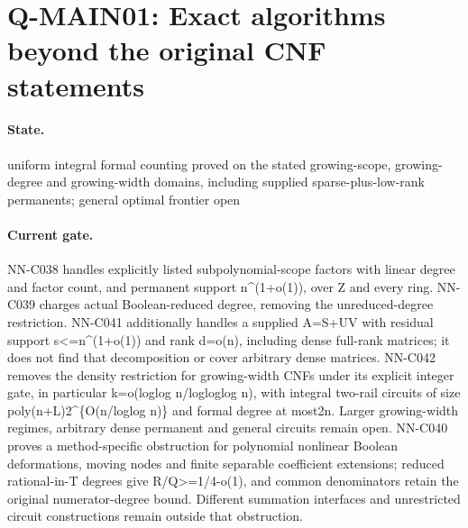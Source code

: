 \section{Q-MAIN01: Exact algorithms beyond the original CNF statements}
\paragraph{State.} uniform integral formal counting proved on the stated growing-scope, growing-degree and growing-width domains, including supplied sparse-plus-low-rank permanents; general optimal frontier open
\paragraph{Current gate.} NN-C038 handles explicitly listed subpolynomial-scope factors with linear degree and factor count, and permanent support n\textasciicircum{}(1+o(1)), over Z and every ring. NN-C039 charges actual Boolean-reduced degree, removing the unreduced-degree restriction. NN-C041 additionally handles a supplied A=S+UV with residual support s<=n\textasciicircum{}(1+o(1)) and rank d=o(n), including dense full-rank matrices; it does not find that decomposition or cover arbitrary dense matrices. NN-C042 removes the density restriction for growing-width CNFs under its explicit integer gate, in particular k=o(loglog n/logloglog n), with integral two-rail circuits of size poly(n+L)2\textasciicircum{}\{O(n/loglog n)\} and formal degree at most2n. Larger growing-width regimes, arbitrary dense permanent and general circuits remain open. NN-C040 proves a method-specific obstruction for polynomial nonlinear Boolean deformations, moving nodes and finite separable coefficient extensions; reduced rational-in-T degrees give R/Q>=1/4-o(1), and common denominators retain the original numerator-degree bound. Different summation interfaces and unrestricted circuit constructions remain outside that obstruction.
